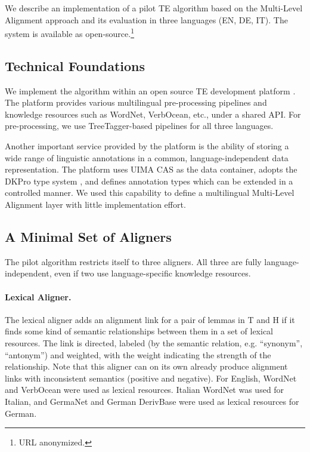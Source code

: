 \documentclass[11pt,letterpaper]{article}
\begin{document}
We describe an implementation of a pilot TE algorithm based on the
Multi-Level Alignment approach and its evaluation in three languages
(EN, DE, IT). The system is available as open-source.\footnote{{URL}
  anonymized.}


\subsection{Technical Foundations}  
\label{sec:techn-found}

We implement the algorithm within an open source TE development
platform \cite{EOP-arch}. The platform provides various multilingual
pre-processing pipelines and knowledge resources such as WordNet,
VerbOcean, etc., under a shared API. For pre-processing, we use
TreeTagger-based pipelines for all three languages.

Another important service provided by the platform is the
ability of storing a wide range of linguistic annotations in a common,
language-independent data representation. The platform uses UIMA CAS
\cite{d04:_uima} as the data container, adopts the DKPro type system
\cite{DKpro}, and defines annotation types which can be extended in a
controlled manner. We used this capability to define a multilingual
Multi-Level Alignment layer  %
with little implementation effort.

\subsection{A Minimal Set of Aligners}

The pilot algorithm restricts itself to three aligners.  All three are
fully language-independent, even if two use
language-specific knowledge resources.

\paragraph{Lexical Aligner.} The lexical aligner adds an alignment link
for a pair of lemmas in T and H if it finds some kind of semantic
relationships between them in a set of lexical resources. The link is
directed, labeled (by the semantic relation, e.g. ``synonym'',
``antonym'') and weighted, with the weight indicating the strength of
the relationship. Note that this aligner can on its own already
produce alignment links with inconsistent semantics (positive and
negative). For English, WordNet and VerbOcean were used as lexical
resources. Italian WordNet was used for Italian, and GermaNet and
German DerivBase \cite{Zeller:2013} were used as lexical resources for
German.
\end{document}
